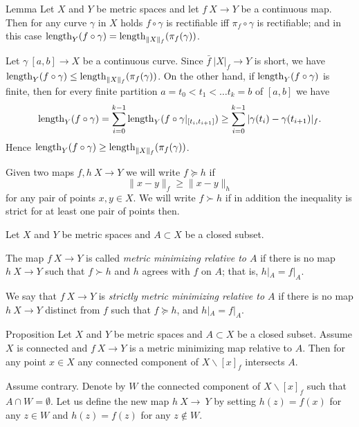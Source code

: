 \documentclass[a4paper,10pt]{amsart}
\begin{document}
\begin{thm}{Lemma}\label{lem:intrinsicmetric}
Let $X$ and $Y$ be metric spaces and let $f\:X\to Y$ be a continuous map. Then for any curve $\gamma$ in $X$ holds $f\circ\gamma$
is rectifiable iff $\pi_f\circ\gamma$ is rectifiable; and in this case $\mathop{\rm length}\nolimits_Y(f\circ\gamma)=\mathop{\rm length}\nolimits_{\|X\|_f}(\pi_f(\gamma))$.
\end{thm}
Let $\gamma\:[a,b]\to X$ be a continuous curve.
Since $\bar f\:|X|_f\to Y$ is short, we have $\mathop{\rm length}\nolimits_Y(f\circ \gamma)\leq\mathop{\rm length}\nolimits_{\|X\|_f}(\pi_f(\gamma))$. On the other hand,
if $\mathop{\rm length}\nolimits_Y(f\circ \gamma)$ is finite, then for every finite partition ${a=t_0<t_1<\ldots t_k=b}$ of $[a,b]$ we have
\[\mathop{\rm length}\nolimits_Y(f\circ \gamma)=\sum_{i=0}^{k-1}\mathop{\rm length}\nolimits_Y(f\circ \gamma|_{[t_i,t_{i+1}]})\geq\sum_{i=0}^{k-1}|\gamma(t_i)-\gamma(t_{i+1})|_f.\]
Hence $\mathop{\rm length}\nolimits_Y(f\circ \gamma)\geq\mathop{\rm length}\nolimits_{\|X\|_f}(\pi_f(\gamma))$.
\qeds



Given two maps $f,h\:X\to Y$ we will write $f\succcurlyeq h$ if 
\[\|x-y\|_f\ge \|x-y\|_h\]
for any pair of points $x,y\in X$.
We will write $f\succ h$ 
if in addition the inequality is strict for at least one pair of points then.



Let $X$ and $Y$ be metric spaces and $A\subset X$ be a closed subset.

The map $f\:X\to Y$ is called \emph{metric minimizing relative to $A$}
if there is no map $h\:X\to Y$ such that $f\succ h$
and $h$ agrees with $f$ on $A$;
that is, $h|_A=f|_A$.

We say that $f\:X\to Y$ is \emph{strictly metric minimizing relative to $A$}
if there is no map $h\:X\to Y$ distinct from $f$
such that $f\succcurlyeq h$, 
and $h|_A=f|_A$.

\begin{thm}{Proposition}\label{prop:point-complement}
Let $X$ and $Y$ be metric spaces 
and $A\subset X$ be a closed subset.
Assume $X$ is connected and $f\:X\to Y$ is a metric minimizing map relative to $A$.
Then for any point $x\in X$ any connected component of $X\backslash [x]_f$ intersects $A$.

\end{thm}

Assume contrary.
Denote by $W$ the connected component of $X\backslash [x]_f$ such that $A\cap W=\emptyset$.
Let us define the new map $h\:X\to\ Y$ 
by setting $h(z)=f(x)$ for any $z\in W$
and $h(z)=f(z)$ for any $z\notin W$.
\end{document}
